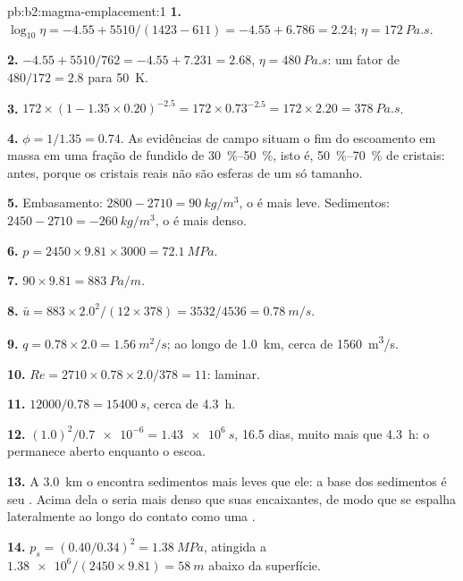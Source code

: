 \begin{solution}{pb:b2:magma-emplacement:1}
\textbf{1.} $\log_{10}\eta = -4.55 + 5510/(1423 - 611) = -4.55 + 6.786 = 2.24$;
$\eta = \qty{172}{Pa.s}$.

\textbf{2.} $-4.55 + 5510/762 = -4.55 + 7.231 = 2.68$, $\eta = \qty{480}{Pa.s}$: um
fator de $480/172 = 2.8$ para \qty{50}{K}.

\textbf{3.} $172\times(1 - 1.35\times0.20)^{-2.5} = 172\times0.73^{-2.5} = 172\times2.20 =
\qty{378}{Pa.s}$.

\textbf{4.} $\phi = 1/1.35 = 0.74$. As evidências de campo situam o fim do escoamento em massa
em uma fração de fundido de \qtyrange{30}{50}{\percent}, isto é,
\qtyrange{50}{70}{\percent} de cristais: antes, porque os cristais reais não são
esferas de um só tamanho.

\textbf{5.} Embasamento: $2800 - 2710 = \qty{90}{kg/m^3}$, o  é mais leve.
Sedimentos: $2450 - 2710 = \qty{-260}{kg/m^3}$, o  é mais denso.

\textbf{6.} $p = 2450\times9.81\times3000 = \qty{72.1}{MPa}$.

\textbf{7.} $90\times9.81 = \qty{883}{Pa/m}$.

\textbf{8.} $\bar u = 883\times2.0^2/(12\times378) = 3532/4536 = \qty{0.78}{m/s}$.

\textbf{9.} $q = 0.78\times2.0 = \qty{1.56}{m^2/s}$; ao longo de \qty{1.0}{km}, cerca de
\qty{1560}{m^3/s}.

\textbf{10.} $Re = 2710\times0.78\times2.0/378 = 11$: laminar.

\textbf{11.} $12000/0.78 = \qty{15400}{s}$, cerca de \qty{4.3}{h}.

\textbf{12.} $(1.0)^2/\num{0.7e-6} = \qty{1.43e6}{s}$, 16.5 dias, muito mais que
\qty{4.3}{h}: o  permanece aberto enquanto o  escoa.

\textbf{13.} A \qty{3.0}{km} o  encontra sedimentos mais leves que ele: a
base dos sedimentos é seu . Acima dela o  seria
mais denso que suas encaixantes, de modo que se espalha lateralmente ao longo do contato como uma
.

\textbf{14.} $p_s = (0.40/0.34)^2 = \qty{1.38}{MPa}$, atingida a
$\num{1.38e6}/(2450\times9.81) = \qty{58}{m}$ abaixo da superfície.


\end{solution}
